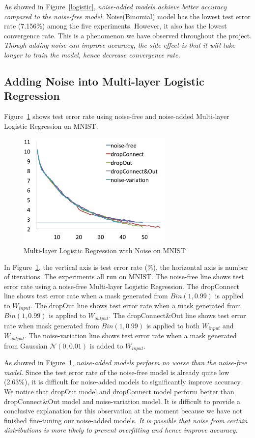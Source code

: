 As showed in Figure~\ref{logistic}, {\em noise-added models achieve better
accuracy compared to the noise-free model.}
Noise(Binomial) model has the lowest test error rate (7.156\%) among the
five experiments. However, it also has the lowest convergence rate.
This is a phenomenon we have observed throughout the project.
{\em Though adding noise can improve accuracy, the side effect is that it
will take longer to train the model, hence decrease convergence rate.}

\subsection{Adding Noise into Multi-layer Logistic Regression}
Figure~\ref{mlp} shows test error rate using noise-free and noise-added
Multi-layer Logistic Regression on MNIST.
\begin{figure}[!htbp]
\centering
\includegraphics[width=215pt]{f-figs/mlp.png}
\caption{Multi-layer Logistic Regression with Noise on MNIST}
\label{mlp}
\end{figure}

In Figure~\ref{mlp}, the vertical axis is test error rate (\%), the
horizontal axis is number of iterations. The experiments all run on MNIST.
The noise-free line shows test error rate using a noise-free Multi-layer
Logistic Regression.
The dropConnect line shows test error rate when a mask generated from
$Bin(1,0.99)$ is applied to $W_{input}$.
The dropOut line shows test error rate when a mask generated from
$Bin(1,0.99)$ is applied to $W_{output}$.
The dropConnect\&Out line shows test error rate when mask generated
from $Bin(1,0.99)$ is applied to both $W_{input}$ and $W_{output}$.
The noise-variation line shows test error rate when a mask generated from
Gaussian $\mathcal{N}(0,0.01)$ is added to $W_{input}$.

As showed in Figure~\ref{mlp}, {\em noise-added models perform no worse than the noise-free model.}
Since the test error rate of the noise-free model is already
quite low (2.63\%), it is difficult for noise-added models to significantly
improve accuracy. We notice that dropOut model and dropConnect model
perform better than dropConnect\&Out model and noise-variation model.
It is difficult to provide a conclusive explanation for this observation at
the moment because we have not finished fine-tuning our noise-added models.
{\em It is possible that noise from certain distributions is more
likely to prevent overfitting and hence improve accuracy.}

